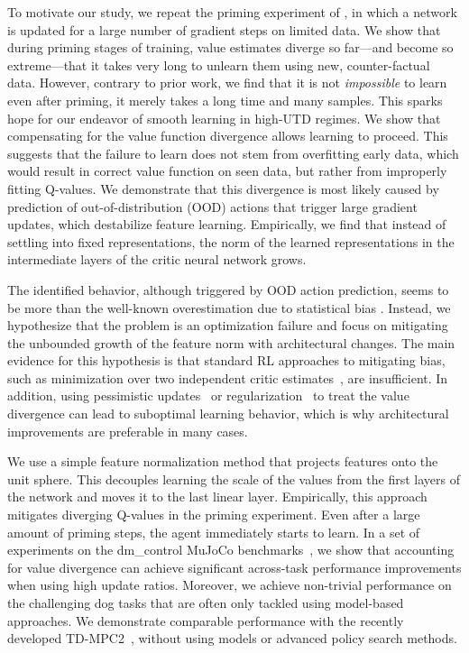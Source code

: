 To motivate our study, we repeat the priming experiment of \textcite{nikishin2022primacy}, in which a network is updated for a large number of gradient steps on limited data. We show that during priming stages of training, value estimates diverge so far---and become so extreme---that it takes very long to unlearn them using new, counter-factual 
data. However, contrary to prior work, we find that it is not \emph{impossible} to learn even after priming, it merely takes a long time and many samples. 
This sparks hope for our endeavor of smooth learning in high-UTD regimes.
We show that compensating for the value function divergence allows learning to proceed. 
This suggests that the failure to learn does not stem from overfitting early data, which would result in correct value function on seen data, but rather from improperly fitting Q-values. 
We demonstrate that this divergence is most likely caused by prediction of out-of-distribution (OOD) actions that trigger large gradient updates, which destabilize feature learning.
Empirically, we find that instead of settling into fixed representations, the norm of the learned representations in the intermediate layers of the critic neural network grows.

The identified behavior, although triggered by OOD action prediction, seems to be more than the well-known overestimation due to statistical bias \parencite{thrun1993issues}. 
Instead, we hypothesize that the problem is an optimization failure and focus on mitigating the unbounded growth of the feature norm with architectural changes.
The main evidence for this hypothesis is that standard RL approaches to mitigating bias, such as minimization over two independent critic estimates~\parencite{fujimoto2018addressing}, are insufficient. 
In addition, using pessimistic updates~\parencite{fujimoto2019bcq, fujimoto2021td3bc} or regularization~\parencite{krogh1991simple, srivastava14dropout} to treat the value divergence can lead to suboptimal learning behavior, which is why architectural improvements are preferable in many cases.


We use a simple feature normalization method \parencite{zhang2019root, wang2020striving, bjorck2022is} that projects features onto the unit sphere.
This decouples learning the scale of the values from the first layers of the network and moves it to the last linear layer.
Empirically, this approach mitigates diverging Q-values in the priming experiment. 
Even after a large amount of priming steps, the agent immediately starts to learn. %
In a set of experiments on the \textsf{dm\_control} MuJoCo benchmarks~\parencite{tunyasuvunakool2020dmcontrol}, we show that accounting for value divergence can achieve significant across-task performance improvements when using high update ratios. 
Moreover, we achieve non-trivial performance on the challenging dog tasks that are often only tackled using model-based approaches. We demonstrate comparable performance with the recently developed TD-MPC2~\parencite{hansen2024tdmpc}, without using models or advanced policy search methods.


